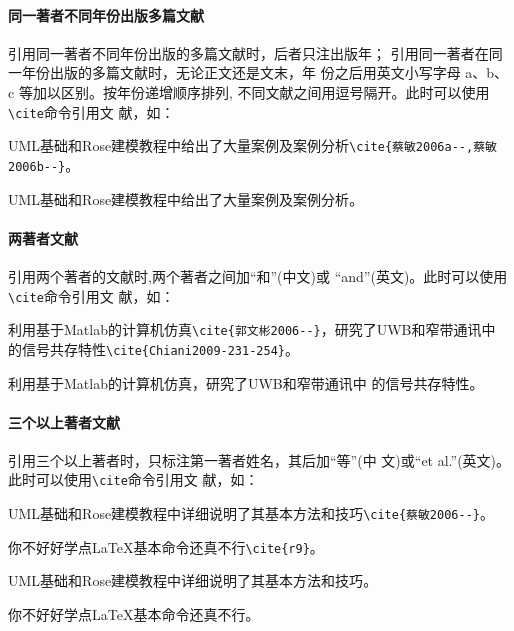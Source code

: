 \documentclass{article}
\newcommand\cs[1]{\texttt{\textbackslash#1}}
\begin{document}
\paragraph{同一著者不同年份出版多篇文献}
引用同一著者不同年份出版的多篇文献时，后者只注出版年；
引用同一著者在同一年份出版的多篇文献时，无论正文还是文末，年
份之后用英文小写字母 a、b、c 等加以区别。按年份递增顺序排列,
不同文献之间用逗号隔开。此时可以使用\cs{cite}命令引用文
献，如：

\begin{center}
  \begin{minipage}{0.45\textwidth}
    \small
    UML基础和Rose建模教程中给出了大量案例及案例分析\verb|\cite{蔡敏2006a--,蔡敏2006b--}|。%
  \end{minipage}
  \begin{boxedminipage}{0.45\textwidth}
    \small
    UML基础和Rose建模教程中给出了大量案例及案例分析\cite{蔡敏2006a--,蔡敏2006b--}。%
  \end{boxedminipage}
\end{center}


\paragraph{两著者文献}

引用两个著者的文献时,两个著者之间加\enquote{和}(中文)或
\enquote{and}(英文)。此时可以使用\cs{cite}命令引用文
献，如：

\begin{center}
  \begin{minipage}{0.45\textwidth}
    \small
    利用基于Matlab的计算机仿真\verb|\cite{郭文彬2006--}|，研究了UWB和窄带通讯中
      的信号共存特性\verb|\cite{Chiani2009-231-254}|。%
  \end{minipage}
  \begin{boxedminipage}{0.45\textwidth}
    \small
    利用基于Matlab的计算机仿真\cite{郭文彬2006--}，研究了UWB和窄带通讯中
      的信号共存特性\cite{Chiani2009-231-254}。%
  \end{boxedminipage}
\end{center}


\paragraph{三个以上著者文献}

引用三个以上著者时，只标注第一著者姓名，其后加\enquote{等}(中
文)或\enquote{et al.}(英文)。此时可以使用\cs{cite}命令引用文
献，如：

\begin{center}
  \begin{minipage}{0.45\textwidth}
    \small
    UML基础和Rose建模教程中详细说明了其基本方法和技巧\verb|\cite{蔡敏2006--}|。

    你不好好学点\LaTeX{}基本命令还真不行\verb|\cite{r9}|。%
  \end{minipage}
  \begin{boxedminipage}{0.45\textwidth}
    \small
    UML基础和Rose建模教程中详细说明了其基本方法和技巧\cite{蔡敏2006--}。

    你不好好学点\LaTeX{}基本命令还真不行\cite{r9}。%
  \end{boxedminipage}
\end{center}
\end{document}
